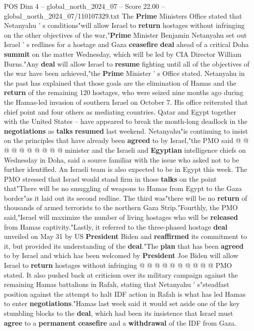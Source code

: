 \begin{textsample}{POS Dim 4 – global\_north\_2024\_07 – Score 22.00 – global\_north\_2024\_07/110107329.txt}  \label{ex:f4_pos_197}
The \textbf{Prime} Ministers Office stated that Netanyahu ' s conditions"will allow Israel to \textbf{return} hostages without infringing on the other objectives of the war,"\textbf{Prime} Minister Benjamin Netanyahu set out Israel ' s redlines for a hostage and Gaza \textbf{ceasefire} \textbf{deal} ahead of a critical Doha \textbf{summit} on the matter Wednesday, which will be led by CIA Director William Burns."Any \textbf{deal} will allow Israel to \textbf{resume} fighting until all of the objectives of the war have been achieved,"the \textbf{Prime} Minister ' s Office stated.
Netanyahu in the past has explained that those goals are the elimination of Hamas and the \textbf{return} of the remaining 120 hostages, who were seized nine months ago during the Hamas-led invasion of southern Israel on October 7.
His office reiterated that chief point and four others as mediating countries.
Qatar and Egypt together with the United States -- have appeared to break the month-long deadlock in the \textbf{negotiations} as \textbf{talks} \textbf{resumed} last weekend.
Netanyahu"is continuing to insist on the principles that have already been \textbf{agreed} to by Israel,"the PMO said @ @ @ @ @ @ @ @ @ @ minister and the Israeli and \textbf{Egyptian} intelligence chiefs on Wednesday in Doha, said a source familiar with the issue who asked not to be further identified.
An Israeli team is also expected to be in Egypt this week.
The PMO stressed that Israel would stand firm in those \textbf{talks} on the point that"There will be no smuggling of weapons to Hamas from Egypt to the Gaza border"as it laid out its second redline.
The third was"there will be no \textbf{return} of thousands of armed terrorists to the northern Gaza Strip."Fourthly, the PMO said,"Israel will maximize the number of living hostages who will be \textbf{released} from Hamas captivity."Lastly, it referred to the three-phased hostage \textbf{deal} unveiled on May 31 by US \textbf{President} Biden and \textbf{reaffirmed} its commitment to it, but provided its understanding of the \textbf{deal}."The \textbf{plan} that has been \textbf{agreed} to by Israel and which has been welcomed by \textbf{President} Joe Biden will allow Israel to \textbf{return} hostages without infringing @ @ @ @ @ @ @ @ @ @ PMO stated.
It also pushed back at criticism over its military campaign against the remaining Hamas battalions in Rafah, stating that Netanyahu ' s"steadfast position against the attempt to halt IDF action in Rafah is what has led Hamas to enter \textbf{negotiations}."Hamas last week said it would set aside one of the key stumbling blocks to the \textbf{deal}, which had been its insistence that Israel must \textbf{agree} to a \textbf{permanent} \textbf{ceasefire} and a \textbf{withdrawal} of the IDF from Gaza.

\end{textsample}
